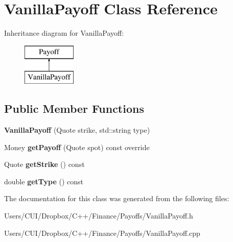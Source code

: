 \hypertarget{class_vanilla_payoff}{}\section{Vanilla\+Payoff Class Reference}
\label{class_vanilla_payoff}
Inheritance diagram for Vanilla\+Payoff\+:\begin{figure}[H]
\begin{center}
\leavevmode
\includegraphics[height=2.000000cm]{class_vanilla_payoff}
\end{center}
\end{figure}
\subsection*{Public Member Functions}
\begin{DoxyCompactItemize}
\item 
\hypertarget{class_vanilla_payoff_ae0d7f1fdb70f4ad9c2002f96df2199d3}{}\label{class_vanilla_payoff_ae0d7f1fdb70f4ad9c2002f96df2199d3} 
{\bfseries Vanilla\+Payoff} (Quote strike, std\+::string type)
\item 
\hypertarget{class_vanilla_payoff_aa141f5b29c30d54448c93a21bef83bb3}{}\label{class_vanilla_payoff_aa141f5b29c30d54448c93a21bef83bb3} 
Money {\bfseries get\+Payoff} (Quote spot) const override
\item 
\hypertarget{class_vanilla_payoff_ae99fb31f1496f723ec598367ece825e3}{}\label{class_vanilla_payoff_ae99fb31f1496f723ec598367ece825e3} 
Quote {\bfseries get\+Strike} () const
\item 
\hypertarget{class_vanilla_payoff_ac1b4cc9e4152ed3f7c07c71270fc1831}{}\label{class_vanilla_payoff_ac1b4cc9e4152ed3f7c07c71270fc1831} 
double {\bfseries get\+Type} () const
\end{DoxyCompactItemize}


The documentation for this class was generated from the following files\+:\begin{DoxyCompactItemize}
\item 
Users/\+C\+U\+I/\+Dropbox/\+C++/\+Finance/\+Payoffs/Vanilla\+Payoff.\+h\item 
Users/\+C\+U\+I/\+Dropbox/\+C++/\+Finance/\+Payoffs/Vanilla\+Payoff.\+cpp\end{DoxyCompactItemize}

